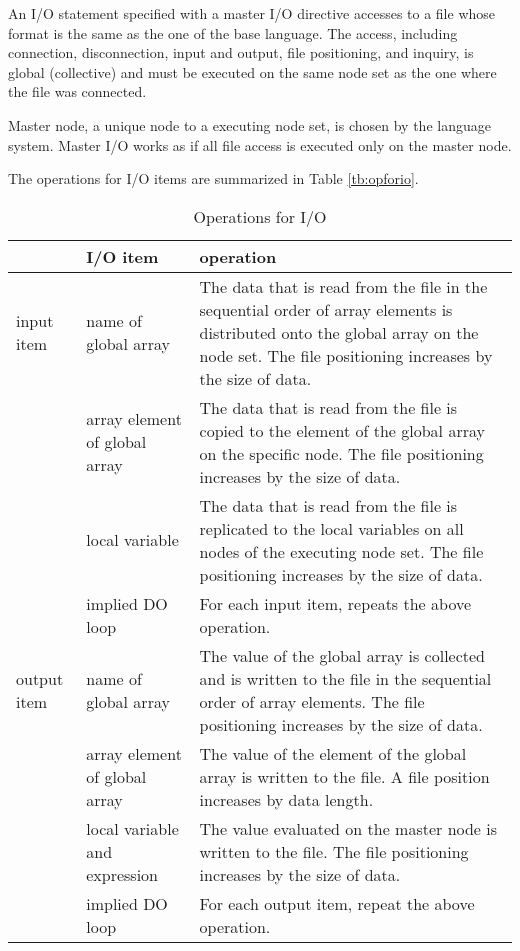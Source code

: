    An I/O statement specified with a master I/O directive accesses to a
   file whose format is the same as the one of the base language.
   The access, including connection, disconnection, input and output,
   file positioning, and inquiry, is global (collective) and must be
   executed on the same node set as the one where the file was
   connected. 

   Master node, a unique node to a executing node set, is chosen by the
   language system.
   Master I/O works as if all file access is executed only on the master
   node.

   The operations for I/O items are summarized in Table \ref{tb:opforio}.

   \begin{table}[h]
    \begin{center}
    \caption{Operations for I/O}
    \label{tb:opforio}
     \begin{tabular}{|l|p{40mm}|p{80mm}|}
      \hline
      \multicolumn{1}{|c}{ }  & {\bf I/O item} & {\bf operation} \\
      \hline
      input item & name of global array & The data that is read 
	      from the file in the sequential order of array elements is distributed onto 
	      the global array on the node set. The file positioning increases by
	      the size of data. \\
      \cline{2-3}
      & array element of global array &  The data that is read from the file
	      is copied to the element of the global array on the specific node.
	      The file positioning increases by the size of data. \\
      \cline{2-3}
      & local variable & The data that is read from the file is replicated to the
	      local variables on all nodes of the executing node
	      set. The file positioning increases by the size of data. \\
      \cline{2-3}
      & implied DO loop & For each input item, repeats the above operation. \\
      \hline
      output item & name of global array & The value of the
	      global array is collected and is written to the
	      file in the sequential order of array elements. The file
	      positioning increases by the size of data. \\
      \cline{2-3}
      & array element of global array &  The value of the element of the
	      global array is written to the
	      file. A file position increases by data length. \\
      \cline{2-3}
      & local variable and expression & The value evaluated on the master node
	      is written to the file. The file positioning increases by
	      the size of data. \\
      \cline{2-3}
      & implied DO loop & For each output item, repeat the above operation. \\
      \hline
      \end{tabular}
     \end{center}
    \label{tb:aaa}
   \end{table}

